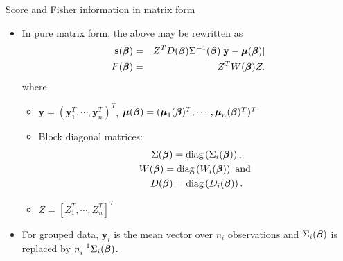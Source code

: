 \documentclass{beamer}
\newenvironment{wideitemize}%
  {\begin{itemize}%
    \setlength{\parskip}{1em}}%
  {\end{itemize}}
\begin{document}
\begin{frame}{Score and Fisher information in matrix form}
\begin{wideitemize}
\item
In pure matrix form, the above may be rewritten as
\begin{eqnarray*}
\textbf{s}(\mbox{\boldmath $\beta$}) &=& Z^TD(\mbox{\boldmath $\beta$})\Sigma^{-1}(\mbox{\boldmath $\beta$})
[\textbf{y}-\mbox{\boldmath $\mu$}(\mbox{\boldmath $\beta$})] \\
F(\mbox{\boldmath $\beta$}) &=& Z^TW(\mbox{\boldmath $\beta$})Z.
\end{eqnarray*}
where 
\begin{itemize}
\item 
$\textbf{y}=(\textbf{y}_1^T,\cdots, \textbf{y}_n^T)^T$,
$\mbox{\boldmath $\mu$}(\mbox{\boldmath $\beta$})=(\mbox{\boldmath $\mu$}_1(\mbox{\boldmath $\beta$})^T,
\cdots,\mbox{\boldmath $\mu$}_n(\mbox{\boldmath $\beta$})^T)^T$
\item Block diagonal matrices:
\begin{multline*}
\Sigma(\mbox{\boldmath $\beta$})=\mbox{diag}\left(\Sigma_i(\mbox{\boldmath $\beta$})\right),\\
W(\mbox{\boldmath $\beta$})=\mbox{diag}\left(W_i(\mbox{\boldmath $\beta$})\right) \text{ and }\\
D(\mbox{\boldmath $\beta$})=\mbox{diag}\left(D_i(\mbox{\boldmath $\beta$})\right).
\end{multline*}

\item  $\displaystyle Z=\left[Z_1^T, \cdots, Z_n^T\right]^T$
\end{itemize}
\item
For grouped data, $\textbf{y}_i$ is the mean vector over $n_i$ observations and
$\Sigma_i(\mbox{\boldmath $\beta$})$ is replaced by $n_i^{-1}\Sigma_i(\mbox{\boldmath $\beta$})$.

\end{wideitemize}
\end{frame}
\end{document}
